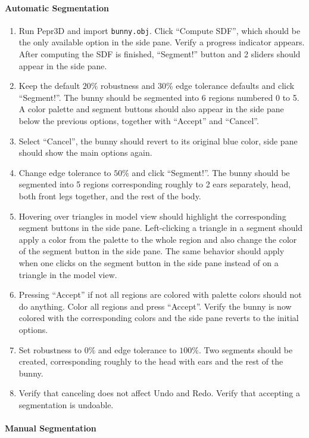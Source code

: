 \paragraph{Automatic Segmentation}

\begin{enumerate}
\item Run Pepr3D and import \texttt{bunny.obj}. Click ``Compute SDF'', which should be the only available option in the side pane. Verify a progress indicator appears. After computing the SDF is finished, ``Segment!'' button and 2 sliders should appear in the side pane.
\item Keep the default $20\%$ robustness and $30\%$ edge tolerance defaults and click ``Segment!''. The bunny should be segmented into 6 regions numbered 0 to 5. A color palette and segment buttons should also appear in the side pane below the previous options, together with ``Accept'' and ``Cancel''.
\item Select ``Cancel'', the bunny should revert to its original blue color, side pane should show the main options again.
\item Change edge tolerance to $50\%$ and click ``Segment!''. The bunny should be segmented into 5 regions corresponding roughly to 2 ears separately, head, both front legs together, and the rest of the body.
\item Hovering over triangles in model view should highlight the corresponding segment buttons in the side pane. Left-clicking a triangle in a segment should apply a color from the palette to the whole region and also change the color of the segment button in the side pane. The same behavior should apply when one clicks on the segment button in the side pane instead of on a triangle in the model view.
\item Pressing ``Accept'' if not all regions are colored with palette colors should not do anything. Color all regions and press ``Accept''. Verify the bunny is now colored with the corresponding colors and the side pane reverts to the initial options.
\item Set robustness to $0\%$ and edge tolerance to $100\%$. Two segments should be created, corresponding roughly to the head with ears and the rest of the bunny.
\item Verify that canceling does not affect Undo and Redo. Verify that accepting a segmentation is undoable.
\end{enumerate}

\paragraph{Manual Segmentation}

